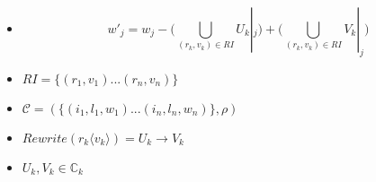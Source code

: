 \documentclass{article}
\begin{document}
\begin{enumerate}
\begin{figure}[H]
      \end{figure}
         \begin{itemize}
         \item $$w'_j = w_j - \Bigg(\bigcup_{(r_k,v_k)\in RI} U_k |_j \Bigg) + \Bigg(\bigcup_{(r_k,v_k) \in RI } V_k|_j \Bigg)$$
         \item $RI = \{(r_1,v_1)...(r_n,v_n)\}$
         \item $\mathcal{C} = (\{(i_1,l_1,w_1)...(i_n,l_n,w_n)\},\rho)$ 
         \item $Rewrite(r_k\langle v_k \rangle) = U_k \rightarrow V_k$
         \item $U_k,V_k \in \mathbb{C}_k$
         \end{itemize}


\end{enumerate}
\end{document}
